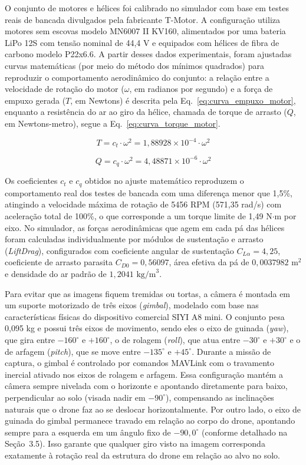 O conjunto de motores e hélices foi calibrado no simulador com base em testes reais de bancada divulgados pela fabricante T-Motor. A configuração utiliza motores sem escovas modelo MN6007 II KV160, alimentados por uma bateria LiPo 12S com tensão nominal de 44,4 V e equipados com hélices de fibra de carbono modelo P22x6.6. A partir desses dados experimentais, foram ajustadas curvas matemáticas (por meio do método dos mínimos quadrados) para reproduzir o comportamento aerodinâmico do conjunto: a relação entre a velocidade de rotação do motor ($\omega$, em radianos por segundo) e a força de empuxo gerada ($T$, em Newtons) é descrita pela Eq.~\eqref{eq:curva_empuxo_motor}, enquanto a resistência do ar ao giro da hélice, chamada de torque de arrasto ($Q$, em Newtons-metro), segue a Eq.~\eqref{eq:curva_torque_motor}.

\begin{equation}
    T = c_t \cdot \omega^2 = 1,88928 \times 10^{-4} \cdot \omega^2
    \label{eq:curva_empuxo_motor}
\end{equation}

\begin{equation}
    Q = c_q \cdot \omega^2 = 4,48871 \times 10^{-6} \cdot \omega^2
    \label{eq:curva_torque_motor}
\end{equation}

Os coeficientes $c_t$ e $c_q$ obtidos no ajuste matemático reproduzem o comportamento real dos testes de bancada com uma diferença menor que 1,5\%, atingindo a velocidade máxima de rotação de 5456 RPM (571,35 rad/s) com aceleração total de 100\%, o que corresponde a um torque limite de 1,49 N$\cdot$m por eixo. No simulador, as forças aerodinâmicas que agem em cada pá das hélices foram calculadas individualmente por módulos de sustentação e arrasto (\textit{LiftDrag}), configurados com coeficiente angular de sustentação $C_{L\alpha} = 4,25$, coeficiente de arrasto parasita $C_{D0} = 0,56097$, área efetiva da pá de $0,0037982\text{ m}^2$ e densidade do ar padrão de $1,2041\text{ kg/m}^3$.

Para evitar que as imagens fiquem tremidas ou tortas, a câmera é montada em um suporte motorizado de três eixos (\textit{gimbal}), modelado com base nas características físicas do dispositivo comercial SIYI A8 mini. O conjunto pesa 0,095 kg e possui três eixos de movimento, sendo eles o eixo de guinada (\textit{yaw}), que gira entre $-160^\circ$ e $+160^\circ$, o de rolagem (\textit{roll}), que atua entre $-30^\circ$ e $+30^\circ$ e o de arfagem (\textit{pitch}), que se move entre $-135^\circ$ e $+45^\circ$. Durante a missão de captura, o gimbal é controlado por comandos MAVLink com o travamento inercial ativado nos eixos de rolagem e arfagem. Essa configuração mantém a câmera sempre nivelada com o horizonte e apontando diretamente para baixo, perpendicular ao solo (visada nadir em $-90^\circ$), compensando as inclinações naturais que o drone faz ao se deslocar horizontalmente. Por outro lado, o eixo de guinada do gimbal permanece travado em relação ao corpo do drone, apontando sempre para a esquerda em um ângulo fixo de $-90,0^\circ$ (conforme detalhado na Seção~3.5). Isso garante que qualquer giro visto na imagem corresponda exatamente à rotação real da estrutura do drone em relação ao alvo no solo.

